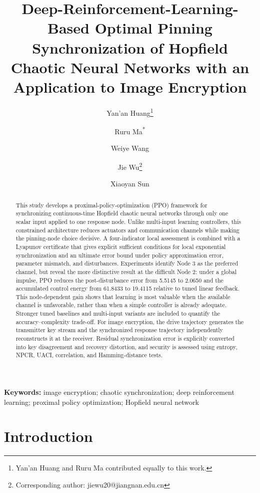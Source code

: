 \documentclass[10pt,twocolumn]{article}
\title{Deep-Reinforcement-Learning-Based Optimal Pinning Synchronization of Hopfield Chaotic Neural Networks with an Application to Image Encryption}
\author[1]{Yan'an Huang\thanks{Yan'an Huang and Ruru Ma contributed equally to this work.}}
\author[2]{Ruru Ma\textsuperscript{*}}
\author[1]{Weiye Wang}
\author[1]{Jie Wu\thanks{Corresponding author: jiewu20@jiangnan.edu.cn}}
\author[1]{Xiaoyan Sun}
\affil[1]{School of Artificial Intelligence and Computer Science, Jiangnan University, Wuxi 214122, China}
\affil[2]{School of Mathematical Sciences, Suzhou University of Science and Technology, Suzhou 215009, China}
\date{}
\newcommand{\rev}[1]{{\color{revisionblue}#1}}
\theoremstyle{definition}
\begin{document}
\maketitle

\begin{abstract}
\rev{This study develops a proximal-policy-optimization (PPO) framework for synchronizing continuous-time Hopfield chaotic neural networks through only one scalar input applied to one response node. Unlike multi-input learning controllers, this constrained architecture reduces actuators and communication channels while making the pinning-node choice decisive. A four-indicator local assessment is combined with a Lyapunov certificate that gives explicit sufficient conditions for local exponential synchronization and an ultimate error bound under policy approximation error, parameter mismatch, and disturbances. Experiments identify Node 3 as the preferred channel, but reveal the more distinctive result at the difficult Node 2: under a global impulse, PPO reduces the post-disturbance error from 5.5145 to 2.0650 and the accumulated control energy from 61.8433 to 19.4115 relative to tuned linear feedback. This node-dependent gain shows that learning is most valuable when the available channel is unfavorable, rather than when a simple controller is already adequate. Stronger tuned baselines and multi-input variants are included to quantify the accuracy--complexity trade-off. For image encryption, the drive trajectory generates the transmitter key stream and the synchronized response trajectory independently reconstructs it at the receiver. Residual synchronization error is explicitly converted into key disagreement and recovery distortion, and security is assessed using entropy, NPCR, UACI, correlation, and Hamming-distance tests.}
\end{abstract}

\noindent\textbf{Keywords:} image encryption; chaotic synchronization; deep reinforcement learning; proximal policy optimization; Hopfield neural network

\section{Introduction}
\label{sec:introduction}
\end{document}
